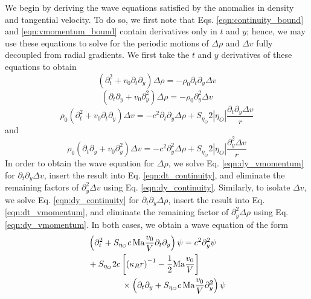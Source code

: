 \documentclass[%
 reprint,
superscriptaddress,
longbibliography,
 amsmath,amssymb,
 prl,
 citeautoscript,
]{revtex4-1}
\begin{document}
We begin by deriving the wave equations satisfied by the anomalies in density and tangential velocity. To do so, we first note that Eqs. \ref{eqn:continuity_bound} and \ref{eqn:vmomentum_bound} contain derivatives only in $t$ and $y$; hence, we may use these equations to solve for the periodic motions of $\Delta \rho$ and $\Delta v$ fully decoupled from radial gradients. We first take the $t$ and $y$ derivatives of these equations to obtain
\begin{equation}
\left( \partial_t^2 + v_0 \partial_t \partial_y \right) \Delta \rho = - \rho_0 \partial_t \partial_y \Delta v
\label{eqn:dt_continuity}
\end{equation}
\begin{equation}
\left( \partial_t \partial_y + v_0 \partial_y^2 \right) \Delta \rho = - \rho_0 \partial_y^2 \Delta v
\label{eqn:dy_continuity}
\end{equation}
\begin{equation}
\rho_0 \left( \partial_t^2 + v_0 \partial_t \partial_y \right) \Delta v = - c^2 \partial_t \partial_y \Delta \rho + S_{\eta_O} 2 \left| \eta_O \right| \frac{\partial_t \partial_y \Delta v}{r}
\label{eqn:dt_vmomentum}
\end{equation}
and
\begin{equation}
\rho_0 \left( \partial_t \partial_y + v_0 \partial_y^2 \right) \Delta v = - c^2 \partial_y^2 \Delta \rho + S_{\eta_O} 2 \left| \eta_O \right| \frac{\partial_y^2 \Delta v}{r}
\label{eqn:dy_vmomentum}
\end{equation}
In order to obtain the wave equation for $\Delta \rho$, we solve Eq. \ref{eqn:dy_vmomentum} for $\partial_t \partial_y \Delta v$, insert the result into Eq. \ref{eqn:dt_continuity}, and eliminate the remaining factors of $\partial_y^2 \Delta v$ using Eq. \ref{eqn:dy_continuity}. Similarly, to isolate $\Delta v$, we solve Eq. \ref{eqn:dy_continuity} for $\partial_t \partial_y \Delta \rho$, insert the result into Eq. \ref{eqn:dt_vmomentum}, and eliminate the remaining factor of $\partial_y^2 \Delta \rho$ using Eq. \ref{eqn:dy_vmomentum}. In both cases, we obtain a wave equation of the form
\begin{equation}
\begin{split}
&\left( \partial_t^2 + S_{\eta_O} c \, {\rm Ma} \frac{v_0}{V} \partial_t \partial_y \right) \psi = c^2 \partial_y^2 \psi \\
&+ S_{\eta_O} 2 c \left[ \left( \kappa_R r \right)^{-1} - \frac{1}{2} {\rm Ma} \frac{v_0}{V} \right] \\
& \quad \quad \quad \quad \times \left( \partial_t \partial_y + S_{\eta_O} c \, {\rm Ma} \frac{v_0}{V} \partial_y^2 \right) \psi
\end{split}
\label{eqn:wave_equation}
\end{equation}
\end{document}
